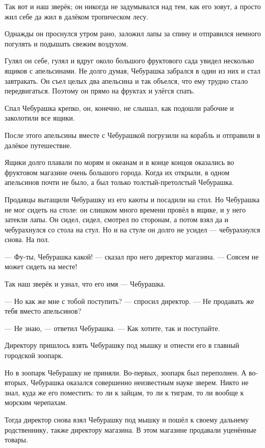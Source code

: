 Так вот и наш зверёк; он никогда не задумывался над тем, как его зовут, а просто жил себе да жил в далёком тропическом лесу.

Однажды он проснулся утром рано, заложил лапы за спину и отправился немного погулять и подышать свежим воздухом.

Гулял он себе, гулял и вдруг около большого фруктового сада увидел несколько ящиков с апельсинами. Не долго думая, Чебурашка забрался в один из них и стал завтракать. Он съел целых два апельсина и так объелся, что ему трудно стало передвигаться. Поэтому он прямо на фруктах и улёгся спать.

Спал Чебурашка крепко, он, конечно, не слышал, как подошли рабочие и заколотили все ящики.

После этого апельсины вместе с Чебурашкой погрузили на корабль и отправили в далёкое путешествие.

Ящики долго плавали по морям и океанам и в конце концов оказались во фруктовом магазине очень большого города. Когда их открыли, в одном апельсинов почти не было, а был только толстый-претолстый Чебурашка.

Продавцы вытащили Чебурашку из его каюты и посадили на стол. Но Чебурашка не мог сидеть на столе: он слишком много времени провёл в ящике, и у него затекли лапы. Он сидел, сидел, смотрел по сторонам, а потом взял да и чебурахнулся со стола на стул. Но и на стуле он долго не усидел — чебурахнулся снова. На пол.

— Фу-ты, Чебурашка какой! — сказал про него директор магазина. — Совсем не может сидеть на месте!

Так наш зверёк и узнал, что его имя — Чебурашка.

— Но как же мне с тобой поступить? — спросил директор. — Не продавать же тебя вместо апельсинов?

— Не знаю, — ответил Чебурашка. — Как хотите, так и поступайте.

Директору пришлось взять Чебурашку под мышку и отнести его в главный городской зоопарк.

Но в зоопарк Чебурашку не приняли. Во-первых, зоопарк был переполнен. А во-вторых, Чебурашка оказался совершенно неизвестным науке зверем. Никто не знал, куда же его поместить: то ли к зайцам, то ли к тиграм, то ли вообще к морским черепахам.

Тогда директор снова взял Чебурашку под мышку и пошёл к своему дальнему родственнику, также директору магазина. В этом магазине продавали уценённые товары.

